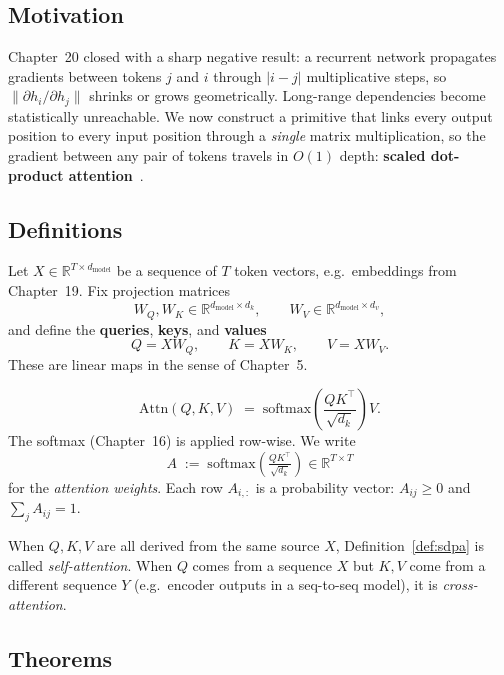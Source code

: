 \subsection*{Motivation}

Chapter~20 closed with a sharp negative result: a recurrent network propagates gradients between tokens $j$ and $i$ through $|i-j|$ multiplicative steps, so $\|\partial h_i/\partial h_j\|$ shrinks or grows geometrically. Long-range dependencies become statistically unreachable. We now construct a primitive that links every output position to every input position through a \emph{single} matrix multiplication, so the gradient between any pair of tokens travels in $O(1)$ depth: \textbf{scaled dot-product attention}~\cite{Vaswani2017}.

\subsection*{Definitions}

Let $X \in \mathbb{R}^{T \times d_{\mathrm{model}}}$ be a sequence of $T$ token vectors, e.g.\ embeddings from Chapter~19. Fix projection matrices
\[
W_Q, W_K \in \mathbb{R}^{d_{\mathrm{model}} \times d_k}, \qquad W_V \in \mathbb{R}^{d_{\mathrm{model}} \times d_v},
\]
and define the \textbf{queries}, \textbf{keys}, and \textbf{values}
\[
Q = X W_Q, \qquad K = X W_K, \qquad V = X W_V.
\]
These are linear maps in the sense of Chapter~5.

\begin{definition}
\label{def:sdpa}
\[
\boxed{\,\mathrm{Attn}(Q,K,V) \;=\; \mathrm{softmax}\!\left(\frac{Q K^\top}{\sqrt{d_k}}\right) V.\,}
\]
The softmax (Chapter~16) is applied row-wise. We write
\[
A \;:=\; \mathrm{softmax}\!\left(\tfrac{QK^\top}{\sqrt{d_k}}\right) \in \mathbb{R}^{T \times T}
\]
for the \emph{attention weights}. Each row $A_{i,:}$ is a probability vector: $A_{ij} \ge 0$ and $\sum_j A_{ij} = 1$.
\end{definition}

\begin{definition}
When $Q,K,V$ are all derived from the same source $X$, Definition~\ref{def:sdpa} is called \emph{self-attention}. When $Q$ comes from a sequence $X$ but $K,V$ come from a different sequence $Y$ (e.g.\ encoder outputs in a seq-to-seq model), it is \emph{cross-attention}.
\end{definition}

\subsection*{Theorems}

